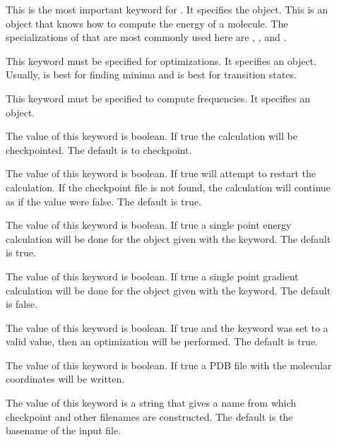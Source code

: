 \begin{description}
\item[] This is the most important keyword for
        .  It specifies the  object.
        This is an object that knows how to compute the energy of a
        molecule.  The specializations of  that
        are most commonly used here are ,
        , and .
\item[] This keyword must be specified for optimizations.
        It specifies an  object.  Usually,
         is best for finding minima and
         is best for transition states.
\item[] This keyword must be specified to compute frequencies.
        It specifies an  object.
\item[] The value of this keyword is boolean.  If
        true the calculation will be checkpointed.  The default is to
        checkpoint.
\item[] The value of this keyword is boolean.  If true
         will attempt to restart the calculation.  If the
        checkpoint file is not found, the calculation will continue as if
        the value were false. The default is true.
\item[] The value of this keyword is boolean.  If
        true a single point energy calculation will be done for the
         object given with the 
        keyword.  The default is true.
\item[] The value of this keyword is boolean.  If
        true a single point gradient calculation will be done for the
         object given with the 
        keyword.  The default is false.
\item[] The value of this keyword is boolean.  If
        true and the  keyword was set to a valid value,
        then an optimization will be performed.  The default is true.
\item[] The value of this keyword is boolean.  If
        true a PDB file with the molecular coordinates will be written.
\item[] The value of this keyword is a string that
        gives a name from which checkpoint and other filenames are
        constructed.  The default is the basename of the input file.
\end{description}


